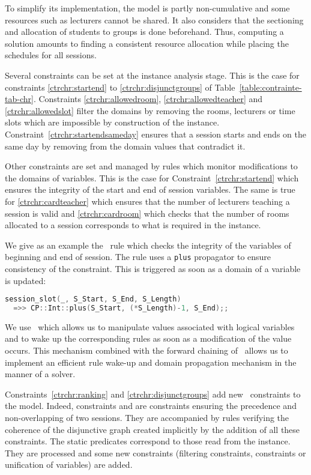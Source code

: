 To simplify its implementation, the model is partly non-cumulative and some resources such as lecturers cannot be shared. It also considers that the sectioning and allocation of students to groups is done beforehand. Thus, computing a solution amounts to finding a consistent resource allocation while placing the schedules for all sessions.

Several constraints can be set at the instance analysis stage. This is the case for constraints \ref{ctrchr:startend} to \ref{ctrchr:disjunctgroups} of Table~\ref{table:contrainte-tab-chr}. Constraints \ref{ctrchr:allowedroom}, \ref{ctrchr:allowedteacher} and \ref{ctrchr:allowedslot} filter the domains by removing the rooms, lecturers or time slots which are impossible by construction of the instance. Constraint~\ref{ctrchr:startendsameday} ensures that a session starts and ends on the same day by removing from the domain values that contradict it.

Other constraints are set and managed by rules which monitor modifications to the domains of variables. This is the case for Constraint~\ref{ctrchr:startend} which ensures the integrity of the start and end of session variables. The same is true for \ref{ctrchr:cardteacher} which ensures that the number of lecturers teaching a session is valid and \ref{ctrchr:cardroom} which checks that the number of rooms allocated to a session corresponds to what is required in the instance.

We give as an example the \CHRPP\ rule which checks the integrity of the variables of beginning and end of session. The rule uses a \texttt{plus} propagator to ensure consistency of the constraint. This is triggered as soon as a domain of a variable is updated:

\begin{lstlisting}[style=custom, language=c++]
session_slot(_, S_Start, S_End, S_Length)
  =>> CP::Int::plus(S_Start, (*S_Length)-1, S_End);;
\end{lstlisting}

We use \CHRPP\ which allows us to manipulate values associated with logical variables and to wake up the corresponding rules as soon as a modification of the value occurs. This mechanism combined with the forward chaining of \CHR\ allows us to implement an efficient rule wake-up and domain propagation mechanism in the manner of a \CSP{} solver.

Constraints~\ref{ctrchr:ranking} and \ref{ctrchr:disjunctgroups} add new \CHR\ constraints to the model. Indeed, constraints  and  are constraints ensuring the precedence and non-overlapping of two sessions. They are accompanied by rules verifying the coherence of the disjunctive graph created implicitly by the addition of all these constraints. The static predicates correspond to those read from the instance. They are processed and some new constraints (filtering constraints, \CHR{} constraints or unification of variables) are added.

